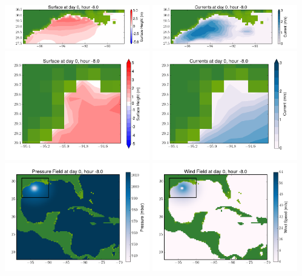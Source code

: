 \documentclass[11pt]{article}
\begin{document}
\includegraphics[width=0.475\textwidth]{frame0064fig4.png}
\vskip 10pt 
\includegraphics[width=0.475\textwidth]{frame0064fig5.png}
\includegraphics[width=0.475\textwidth]{frame0064fig6.png}
\vskip 10pt 
\includegraphics[width=0.475\textwidth]{frame0064fig7.png}
\includegraphics[width=0.475\textwidth]{frame0064fig8.png}
\vskip 10pt 
\includegraphics[width=0.475\textwidth]{frame0064fig9.png}
\end{document}
